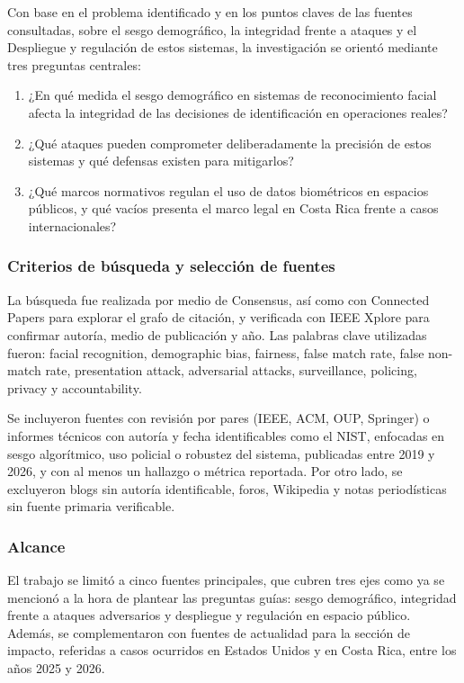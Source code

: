 Con base en el problema identificado y en los puntos claves de las fuentes consultadas, sobre el sesgo demográfico, la integridad frente a ataques y el Despliegue y regulación de estos sistemas, la investigación se orientó mediante tres preguntas centrales:

\begin{enumerate} [leftmargin=1.5cm]
    \item ¿En qué medida el sesgo demográfico en sistemas de reconocimiento facial afecta la integridad de las decisiones de identificación en operaciones reales?
    \item ¿Qué ataques pueden comprometer deliberadamente la precisión de estos sistemas y qué defensas existen para mitigarlos?
    \item ¿Qué marcos normativos regulan el uso de datos biométricos en espacios públicos, y qué vacíos presenta el marco legal en Costa Rica frente a casos internacionales?
\end{enumerate}

\subsubsection{Criterios de búsqueda y selección de fuentes}

La búsqueda fue realizada por medio de Consensus, así como con Connected Papers para explorar el grafo de citación, y verificada con IEEE Xplore para confirmar autoría, medio de publicación y año. Las palabras clave utilizadas fueron: facial recognition, demographic bias, fairness, false match rate, false non-match rate, presentation attack, adversarial attacks, surveillance, policing, privacy y accountability.

Se incluyeron fuentes con revisión por pares (IEEE, ACM, OUP, Springer) o informes técnicos con autoría y fecha identificables como el NIST, enfocadas en sesgo algorítmico, uso policial o robustez del sistema, publicadas entre 2019 y 2026, y con al menos un hallazgo o métrica reportada. Por otro lado, se excluyeron blogs sin autoría identificable, foros, Wikipedia y notas periodísticas sin fuente primaria verificable.

\subsubsection{Alcance}

El trabajo se limitó a cinco fuentes principales, que cubren tres ejes como ya se mencionó a la hora de plantear las preguntas guías: sesgo demográfico, integridad frente a ataques adversarios y despliegue y regulación en espacio público. Además, se complementaron con fuentes de actualidad para la sección de impacto, referidas a casos ocurridos en Estados Unidos y en Costa Rica, entre los años 2025 y 2026.

